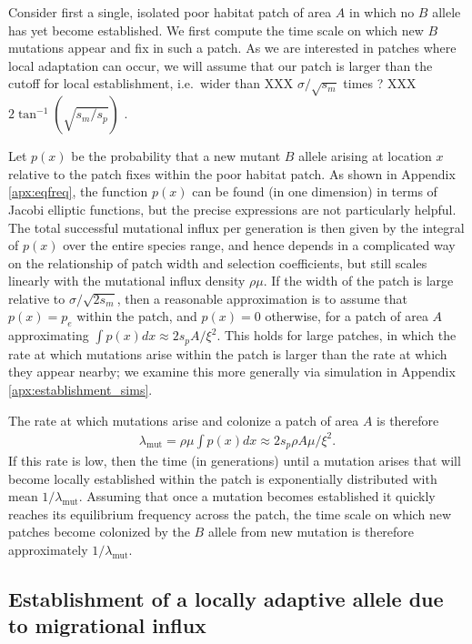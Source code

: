 \documentclass{article}
\newcommand{\mutrate}{\lambda_\text{mut}}
\begin{document}
Consider first a single, isolated poor habitat patch of area $A$ in which no $B$ allele has yet become established. 
We first compute the time scale on which new $B$ mutations appear and fix in such a patch.
As we are interested in patches where local adaptation can occur,
we will assume that our patch is larger than the cutoff for local establishment, 
i.e.\ wider than XXX $\sigma/\sqrt{s_m}$ times ? XXX $2 \tan^{-1} (\sqrt{s_m/s_p})$ \citep{slatkin1973geneflow}.

Let $p(x)$ be the probability that a new mutant $B$ allele arising at location $x$ 
relative to the patch fixes within the poor habitat patch.
As shown in Appendix \ref{apx:eqfreq},
the function $p(x)$ can be found (in one dimension) in terms of Jacobi elliptic functions,
but the precise expressions are not particularly helpful.
The total successful mutational influx per generation is then given by the integral of $p(x)$ over the entire species range,
and hence depends in a complicated way on the relationship of patch width and selection coefficients,
but still scales linearly with the mutational influx density $\rho \mu$.
If the width of the patch is large relative to $\sigma/\sqrt{2s_m}$, 
then a reasonable approximation is to assume that $p(x) = p_e$ within the patch, and $p(x) = 0$ otherwise,
for a patch of area $A$ approximating $\int p(x) dx \approx 2 s_p A / \xi^2$. 
This holds for large patches, in which the rate at which mutations arise within the patch is larger 
than the rate at which they appear nearby;
we examine this more generally via simulation in Appendix \ref{apx:establishment_sims}.

The rate at which mutations arise and colonize a patch of area $A$ is therefore
\begin{align} \label{eqn:mutrate}
  \mutrate = \rho \mu \int p(x) dx  \approx 2 s_p \rho A \mu / \xi^2.
\end{align}
If this rate is low, then the time (in generations) until a mutation arises that
will become locally established within the patch is exponentially distributed with mean $1/\mutrate$.  
Assuming that once a mutation becomes established it quickly reaches its equilibrium frequency across the patch, 
the time scale on which new patches become colonized by the $B$ allele from new mutation is therefore approximately $1/\mutrate$.


\subsection{Establishment of a locally adaptive allele due to migrational influx}
\label{ss:patchymigration}
\end{document}
